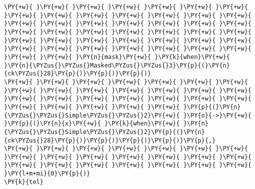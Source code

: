 \begin{Verbatim}[commandchars=\\\{\}]
\PY{+w}{ }\PY{+w}{ }\PY{+w}{ }\PY{+w}{ }\PY{+w}{ }\PY{+w}{ }\PY{+w}{ }\PY{+w}{ }\PY{+w}{ }\PY{+w}{ }\PY{+w}{ }\PY{+w}{ }\PY{+w}{ }\PY{+w}{ }\PY{+w}{ }\PY{+w}{ }\PY{+w}{ }\PY{+w}{ }\PY{+w}{ }\PY{+w}{ }\PY{+w}{ }\PY{+w}{ }\PY{+w}{ }\PY{+w}{ }\PY{+w}{ }\PY{+w}{ }\PY{+w}{ }\PY{+w}{ }\PY{+w}{ }\PY{+w}{ }\PY{+w}{ }\PY{+w}{ }\PY{+w}{ }\PY{+w}{ }\PY{+w}{ }\PY{+w}{ }\PY{+w}{ }\PY{+w}{ }\PY{+w}{ }\PY{+w}{ }\PY{+w}{ }\PY{+w}{ }\PY{+w}{ }\PY{+w}{ }\PY{n}{mask}\PY{+w}{ }\PY{k}{when}\PY{+w}{ }\PY{n}{\PYZus{}\PYZus{}Masked\PYZus{}\PYZus{}3}\PY{p}{(}\PY{n}{ck\PYZus{}28}\PY{p}{)}\PY{p}{)}\PY{p}{)}
\PY{+w}{ }\PY{+w}{ }\PY{+w}{ }\PY{+w}{ }\PY{+w}{ }\PY{+w}{ }\PY{+w}{ }\PY{+w}{ }\PY{+w}{ }\PY{+w}{ }\PY{+w}{ }\PY{+w}{ }\PY{+w}{ }\PY{+w}{ }\PY{+w}{ }\PY{+w}{ }\PY{+w}{ }\PY{+w}{ }\PY{+w}{ }\PY{+w}{ }\PY{+w}{ }\PY{+w}{ }\PY{+w}{ }\PY{+w}{ }\PY{+w}{ }\PY{+w}{ }\PY{p}{(}\PY{n}{\PYZus{}\PYZus{}Simple\PYZus{}\PYZus{}2}\PY{+w}{ }\PY{o}{->}\PY{+w}{ }\PY{p}{(}\PY{n}{x}\PY{+w}{ }\PY{k}{when}\PY{+w}{ }\PY{n}{\PYZus{}\PYZus{}Simple\PYZus{}\PYZus{}2}\PY{p}{(}\PY{n}{ck\PYZus{}28}\PY{p}{)}\PY{p}{)}\PY{p}{)}\PY{p}{)}\PY{p}{,}
\PY{+w}{ }\PY{+w}{ }\PY{+w}{ }\PY{+w}{ }\PY{+w}{ }\PY{+w}{ }\PY{+w}{ }\PY{+w}{ }\PY{+w}{ }\PY{+w}{ }\PY{+w}{ }\PY{+w}{ }\PY{+w}{ }\PY{+w}{ }\PY{+w}{ }\PY{+w}{ }\PY{+w}{ }\PY{+w}{ }\PY{+w}{ }\PY{+w}{ }\PY{+w}{ }\PY{l+m+mi}{0}\PY{p}{)}
\PY{k}{tel}
\end{Verbatim}
